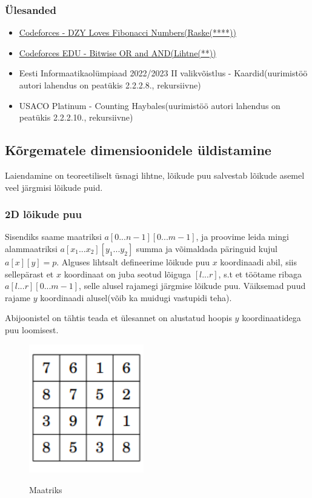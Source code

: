 \documentclass{trkut}
\theoremstyle{definition}
\begin{document}
\subsubsection{Ülesanded}
\begin{itemize}
    \item \href{https://codeforces.com/problemset/problem/446/C}{Codeforces - DZY Loves Fibonacci Numbers(Raske(****))}
    \item \href{https://codeforces.com/edu/course/2/lesson/5/2/practice/contest/279653/problem/C}{Codeforces EDU - Bitwise OR and AND(Lihtne(**))}
    \item Eesti Informaatikaolümpiaad 2022/2023 II valikvõistlus - Kaardid(uurimistöö autori lahendus on peatükis 2.2.2.8., rekursiivne)
    \item USACO Platinum - Counting Haybales(uurimistöö autori lahendus on peatükis 2.2.2.10., rekursiivne)
\end{itemize}

\subsection{Kõrgematele dimensioonidele üldistamine}

Laiendamine on teoreetiliselt üsnagi lihtne, lõikude puu salvestab lõikude asemel veel järgmisi lõikude puid.

\subsubsection{2D lõikude puu}
Sisendiks saame maatriksi $a[0...n-1][0...m-1]$, ja proovime leida mingi alammaatriksi $a[x_1...x_2][y_1...y_2]$ summa ja võimaldada päringuid kujul $a[x][y]=p$.
Alguses lihtsalt defineerime lõikude puu $x$ koordinaadi abil, siis sellepärast et $x$ koordinaat on juba seotud lõiguga $[l...r]$, s.t et töötame ribaga $a[l...r][0...m-1]$, selle alusel rajamegi järgmise lõikude puu. Väiksemad puud rajame $y$ koordinaadi alusel(võib ka muidugi vastupidi teha). \parencite{EMaxx}

Abijoonistel on tähtis teada et ülesannet on alustatud hoopis $y$ koordinaatidega puu loomisest\parencite{CPH}.
\begin{figure}[H]%
    \includegraphics[width=5cm]{maatriks.png}%
    \caption{Maatriks}%
    \label{CPH}%
\end{figure}
\end{document}
